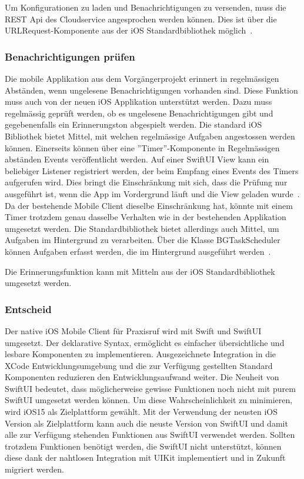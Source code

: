 Um Konfigurationen zu laden und Benachrichtigungen zu versenden, muss die REST Api des Cloudservice angesprochen werden können.
Dies ist über die URLRequest-Komponente aus der iOS Standardbibliothek möglich~\cite{ios_urlrequest}.

\subsubsection{Benachrichtigungen prüfen}

Die mobile Applikation aus dem Vorgängerprojekt erinnert in regelmässigen Abständen, wenn ungelesene Benachrichtigungen vorhanden sind.
Diese Funktion muss auch von der neuen iOS Applikation unterstützt werden.
Dazu muss regelmässig geprüft werden, ob es ungelesene Benachrichtigungen gibt und gegebenenfalls ein Erinnerungston abgespielt werden.
Die standard iOS Bibliothek bietet Mittel, mit welchen regelmässige Aufgaben angestossen werden können.
Einerseits können über eine ''Timer''-Komponente in Regelmässigen abständen Events veröffentlicht werden.
Auf einer SwiftUI View kann ein beliebiger Listener registriert werden, der beim Empfang eines Events des Timers aufgerufen wird.
Dies bringt die Einschränkung mit sich, dass die Prüfung nur ausgeführt ist, wenn die App im Vordergrund läuft und die View geladen wurde~\cite{ios_timer}.
Da der bestehende Mobile Client dieselbe Einschränkung hat, könnte mit einem Timer trotzdem genau dasselbe Verhalten wie in der bestehenden Applikation umgesetzt werden.
Die Standardbibliothek bietet allerdings auch Mittel, um Aufgaben im Hintergrund zu verarbeiten.
Über die Klasse BGTaskScheduler können Aufgaben erfasst werden, die im Hintergrund ausgeführt werden~\cite{ios_bgtaskscheduler}.

Die Erinnerungsfunktion kann mit Mitteln aus der iOS Standardbibliothek umgesetzt werden.

\subsubsection{Entscheid}

Der native iOS Mobile Client für Praxisruf wird mit Swift und SwiftUI umgesetzt.
Der deklarative Syntax, ermöglicht es einfacher übersichtliche und lesbare Komponenten zu implementieren.
Ausgezeichnete Integration in die XCode Entwicklungsumgebung und die zur Verfügung gestellten Standard Komponenten reduzieren den Entwicklungsaufwand weiter.
Die Neuheit von SwiftUI bedeutet, dass möglicherweise gewisse Funktionen noch nicht mit purem SwiftUI umgesetzt werden können.
Um diese Wahrscheinlichkeit zu minimieren, wird iOS15 als Zielplattform gewählt.
Mit der Verwendung der neusten iOS Version als Zielplattform kann auch die neuste Version von SwiftUI und damit alle zur Verfügung stehenden Funktionen aus SwiftUI verwendet werden.
Sollten trotzdem Funktionen benötigt werden, die SwiftUI nicht unterstützt, können diese dank der nahtlosen Integration mit UIKit implementiert und in Zukunft migriert werden.

\clearpage
